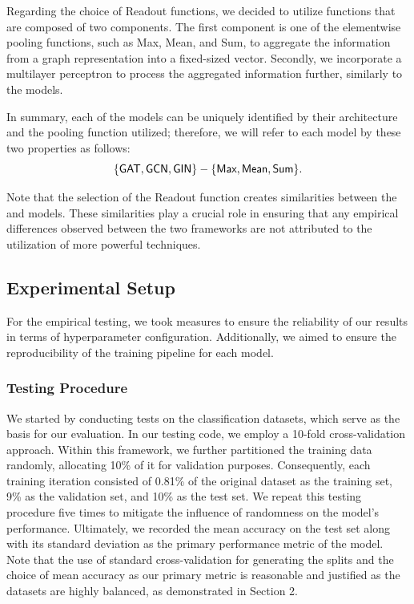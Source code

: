 Regarding the choice of \textsf{Readout} functions, we decided to utilize functions that are composed of two components. The first component is one of the elementwise pooling functions, such as \textsf{Max}, \textsf{Mean}, and \textsf{Sum}, to aggregate the information from a graph representation into a fixed-sized vector. Secondly, we incorporate a multilayer perceptron to process the aggregated information further, similarly to the \wlnn models.

In summary, each of the \gnn models can be uniquely identified by their \gnn architecture and the pooling function utilized; therefore, we will refer to each model by these two properties as follows:
\begin{equation*}
	{\{\gat, \gcn, \gin\}} - \{\textsf{Max}, \textsf{Mean}, \textsf{Sum}\}.
\end{equation*}

Note that the selection of the Readout function creates similarities between the \gnn and \wlnn models. These similarities play a crucial role in ensuring that any empirical differences observed between the two frameworks are not attributed to the utilization of more powerful techniques.

\subsection{Experimental Setup}

For the empirical testing, we took measures to ensure the reliability of our results in terms of hyperparameter configuration. Additionally, we aimed to ensure the reproducibility of the training pipeline for each model.

\subsubsection{Testing Procedure}

We started by conducting tests on the classification datasets, which serve as the basis for our evaluation. In our testing code, we employ a 10-fold cross-validation approach. Within this framework, we further partitioned the training data randomly, allocating 10\% of it for validation purposes. Consequently, each training iteration consisted of 0.81\% of the original dataset as the training set, 9\% as the validation set, and 10\% as the test set. We repeat this testing procedure five times to mitigate the influence of randomness on the model's performance. Ultimately, we recorded the mean accuracy on the test set along with its standard deviation as the primary performance metric of the model. Note that the use of standard cross-validation for generating the splits and the choice of mean accuracy as our primary metric is reasonable and justified as the datasets are highly balanced, as demonstrated in Section 2.

